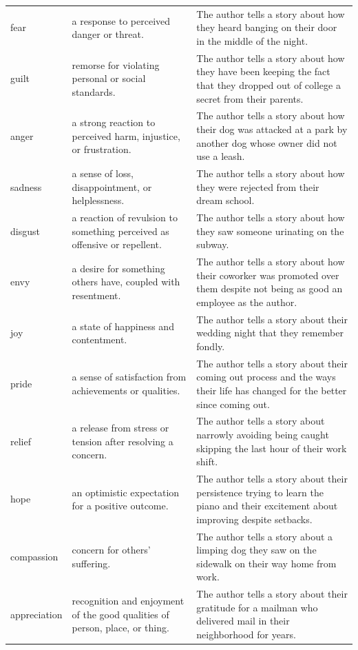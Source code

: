 \begin{longtable}[width=0.9\textwidth]{p{}p{}p{}}
{} \\
\midrule
fear & a response to perceived danger or threat. & The author tells a story about how they heard banging on their door in the middle of the night. \\
guilt & remorse for violating personal or social standards. & The author tells a story about how they have been keeping the fact that they dropped out of college a secret from their parents. \\
anger & a strong reaction to perceived harm, injustice, or frustration. & The author tells a story about how their dog was attacked at a park by another dog whose owner did not use a leash. \\
sadness & a sense of loss, disappointment, or helplessness. & The author tells a story about how they were rejected from their dream school. \\
disgust & a reaction of revulsion to something perceived as offensive or repellent. & The author tells a story about how they saw someone urinating on the subway. \\
envy & a desire for something others have, coupled with resentment. & The author tells a story about how their coworker was promoted over them despite not being as good an employee as the author.  \\
joy & a state of happiness and contentment. & The author tells a story about their wedding night that they remember fondly. \\
pride & a sense of satisfaction from achievements or qualities. & The author tells a story about their coming out process and the ways their life has changed for the better since coming out. \\
relief & a release from stress or tension after resolving a concern. & The author tells a story about narrowly avoiding being caught skipping the last hour of their work shift. \\
hope & an optimistic expectation for a positive outcome. & The author tells a story about their persistence trying to learn the piano and their excitement about improving despite setbacks. \\
compassion & concern for others' suffering. & The author tells a story about a limping dog they saw on the sidewalk on their way home from work. \\
appreciation & recognition and enjoyment of the good qualities of person, place, or thing. & The author tells a story about their gratitude for a mailman who delivered mail in their neighborhood for years. \\

\end{longtable}
